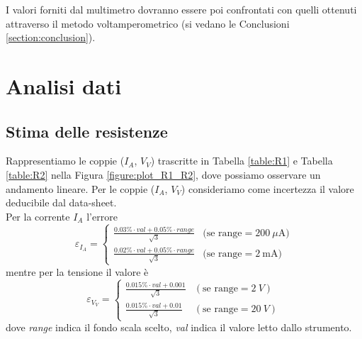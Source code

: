 \documentclass[
    reprint, 
    superscriptaddress, 
    altaffilletter, 
    amsmath, 
    amssymb, 
    a4paper
]{revtex4-2}
\newcommand{\reftab}[1]{Tabella {\ref{#1}}}%
\newcommand{\reffig}[1]{Figura {\ref{#1}}}%
\newcommand{\mstdErr}[1]{\varepsilon_{#1}}
\begin{document}
    I valori forniti dal multimetro dovranno essere poi confrontati con quelli ottenuti attraverso il metodo voltamperometrico (si vedano le Conclusioni \ref{section:conclusion}).


    \section{Analisi dati}
    \label{section:analysis}

    \subsection{Stima delle resistenze}

    Rappresentiamo le coppie ($I_A$, $V_V$) trascritte in \reftab{table:R1} e \reftab{table:R2} nella \reffig{figure:plot_R1_R2}, dove possiamo osservare un andamento lineare. Per le coppie ($I_A$, $V_V$) consideriamo come incertezza il valore deducibile dal data-sheet.\\
    Per la corrente $I_A$ l'errore 
    \[
        \mstdErr{I_A} =
            \begin{cases}
                \frac{0.03\%\cdot val + 0.05\%\cdot range}{\sqrt{3}} & \text{(se range}=200~\mu\text{A)}\\
                \frac{0.02\%\cdot val + 0.05\%\cdot range}{\sqrt{3}} & \text{(se range}=2~\text{mA)}
            \end{cases}
    \]
    mentre per la tensione il valore è
    \[
        \mstdErr{V_V} =
            \begin{cases}
                \frac{0.015\%\cdot val+0.001}{\sqrt{3}} & (\text{se range}=2~V)\\
                \frac{0.015\%\cdot val+0.01 }{\sqrt{3}} & (\text{se range}=20~V)
            \end{cases}
    \]
    dove \textit{range} indica il fondo scala scelto, \textit{val} indica il valore letto dallo strumento.
\end{document}
